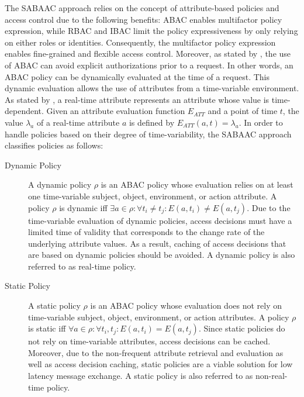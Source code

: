 The SABAAC approach relies on the concept of attribute-based policies and access control due to the following benefits:
ABAC enables multifactor policy expression, while RBAC and IBAC limit the policy expressiveness by only relying on either roles or identities.
Consequently, the multifactor policy expression enables fine-grained and flexible access control.
Moreover, as stated by \citeauthor{Hu2014} \cite{Hu2014}, the use of ABAC can avoid explicit authorizations prior to a request.
In other words, an ABAC policy can be dynamically evaluated at the time of a request.
This dynamic evaluation allows the use of attributes from a time-variable environment.
As stated by \citeauthor{Burmester2013} \cite{Burmester2013}, a real-time attribute represents an attribute whose value is time-dependent.
Given an attribute evaluation function $E_{ATT}$ and a point of time $t$, the value $\lambda_a$ of a real-time attribute $a$ is defined by $E_{ATT}(a, t) = \lambda_a$.
In order to handle policies based on their degree of time-variability, the SABAAC approach classifies policies as follows:
\begin{description}
    \item[Dynamic Policy] A dynamic policy $\rho$ is an ABAC policy whose evaluation relies on at least one time-variable subject, object, environment, or action attribute.
    A policy $\rho$ is dynamic iff $\exists a \in \rho: \forall t_i \neq t_j: E(a,t_i) \neq E(a,t_j)$.
    Due to the time-variable evaluation of dynamic policies, access decisions must have a limited time of validity that corresponds to the change rate of the underlying attribute values.
    As a result, caching of access decisions that are based on dynamic policies should be avoided.
    A dynamic policy is also referred to as real-time policy.
    \item[Static Policy] A static policy $\rho$ is an ABAC policy whose evaluation does not rely on time-variable subject, object, environment, or action attributes.
    A policy $\rho$ is static iff $\forall a \in \rho: \forall t_i,t_j: E(a,t_i) = E(a,t_j)$.
    Since static policies do not rely on time-variable attributes, access decisions can be cached.
    Moreover, due to the non-frequent attribute retrieval and evaluation as well as access decision caching, static policies are a viable solution for low latency message exchange.
    A static policy is also referred to as non-real-time policy.
\end{description}

